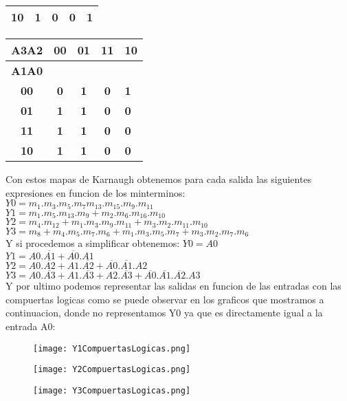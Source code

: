 \documentclass[english]{article}
\begin{document}
\begin{table}[htb]
\begin{tabular}{|c|c|c|c|l|}
\textbf{10}   & \textbf{1}  & \textbf{0}  & \textbf{0}  & \textbf{1}  \\ \hline
\end{tabular}
\begin{tabular}{|c|c|c|c|l|}
\hline
\textbf{A3A2} & \textbf{00} & \textbf{01} & \textbf{11} & \textbf{10} \\ \hline
\textbf{A1A0} & \multicolumn{4}{c|}{\textbf{}}                        \\ \hline
\textbf{00}   & \textbf{0}  & \textbf{1}  & \textbf{0}  & \textbf{1}  \\ \hline
\textbf{01}   & \textbf{1}  & \textbf{1}  & \textbf{0}  & \textbf{0}  \\ \hline
\textbf{11}   & \textbf{1}  & \textbf{1}  & \textbf{0}  & \textbf{0}  \\ \hline
\textbf{10}   & \textbf{1}  & \textbf{1}  & \textbf{0}  & \textbf{0}  \\ \hline
\end{tabular}
\end{table}

Con estos mapas de Karnaugh obtenemos para cada salida las siguientes expresiones en funcion de los minterminos: \\
$Y0 = m_1 . m_3 . m_5 . m_7 m_{13} . m_{15} . m_9 . m_{11}$ \\
$Y1 = m_1 . m_5 . m_{13} . m_9 + m_2 . m_6 . m_{16} . m_{10}$ \\
$Y2 = m_4 . m_{12} + m_1 . m_3 . m_9 . m_{11} + m_3 . m_2 . m_{11} . m_{10}$\\
$Y3 = m_8 + m_4 . m_5 . m_7 . m_6 + m_1 . m_3 . m_5 . m_7 + m_3 . m_2 . m_7 . m_6$\\
Y si procedemos a simplificar obtenemos:
$Y0 = A0$\\
$Y1 = A0 . \overline{A1} + \overline{A0} . A1$\\
$Y2 = A0 . \overline{A2} + A1 . \overline{A2} + \overline{A0} . \overline{A1} . A2$\\
$Y3 = A0 . \overline{A3} + A1 . \overline{A3} + A2 . \overline{A3} + \overline{A0} . \overline{A1} . \overline{A2} . A3$\\
Y por ultimo podemos representar las salidas en funcion de las entradas con las compuertas logicas como se puede observar en los graficos que mostramos a continuacion, donde no representamos Y0 ya que es directamente igual a la entrada A0:

\begin{figure}[htb] 
  \texttt{[image: Y1CompuertasLogicas.png]}
\end{figure}

\begin{figure}[htb] 
  \texttt{[image: Y2CompuertasLogicas.png]}
\end{figure}

\begin{figure}[htb] 
  \texttt{[image: Y3CompuertasLogicas.png]}
\end{figure}
\end{document}
